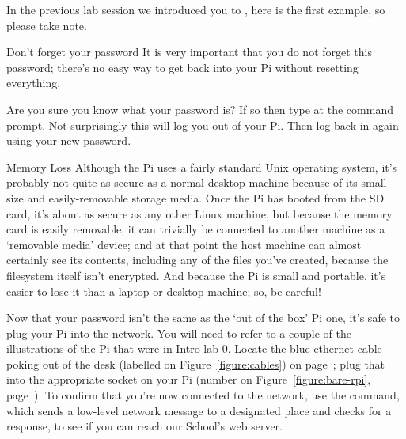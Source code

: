 In the previous lab session we introduced you to , here is the first example, so please take note.

\begin{danger}{Don't forget your password}
It is very important that you do not forget this password; there's no easy way to get back into your Pi without resetting everything.
\end{danger}

Are you sure you know what your password is? If so then type  at the command prompt. Not surprisingly this will log you out of your Pi. Then log back in again using your new password.

\begin{danger}{Memory Loss}
Although the Pi uses a fairly standard Unix operating system, it's probably not quite as secure as a normal desktop machine because of its small size and easily-removable storage media. Once the Pi has booted from the SD card, it's about as secure as any other Linux machine, but because the memory card is easily removable, it can trivially be connected to another machine as a `removable media' device; and at that point the host machine can almost certainly see its contents, including any of the files you've created, because the filesystem itself isn't encrypted. And because the Pi is small and portable, it's easier to lose it than a laptop or desktop machine; so, be careful!
\end{danger}

Now that your password isn't the same as the `out of the box' Pi one, it's safe to plug your Pi into the network. You will need to refer to a couple of the illustrations of the Pi that were in Intro lab 0. Locate the blue ethernet cable poking out of the desk (labelled \protect{} on Figure~\ref{figure:cables}) on page~\pageref{figure:cables}; plug that into the appropriate socket on your Pi (number  on Figure~\ref{figure:bare-rpi}, page~\pageref{figure:bare-rpi}). To confirm that you're now connected to the network, use the  command, which sends a low-level network message to a designated place and checks for a response, to see if you can reach our School's web server.


